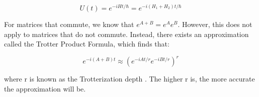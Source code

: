 \begin{equation} 
        U(t) = e^{-i H t /\hbar} = e^{-i (H_1 + H_2)t/\hbar}
    \end{equation}

For matrices that commute, we know that $e^{A+B} = e^A e^B$. However, this does not apply to matrices that do not commute. Instead, there exists an approximation called the Trotter Product Formula, which finds that:

\begin{equation} 
        e^{-i (A + B) t} \approx (e^{-iAt/r}e^{-iBt/r})^r
    \end{equation}

where r is known as the Trotterization depth \cite{trot2023}. The higher r is, the more accurate the approximation will be.